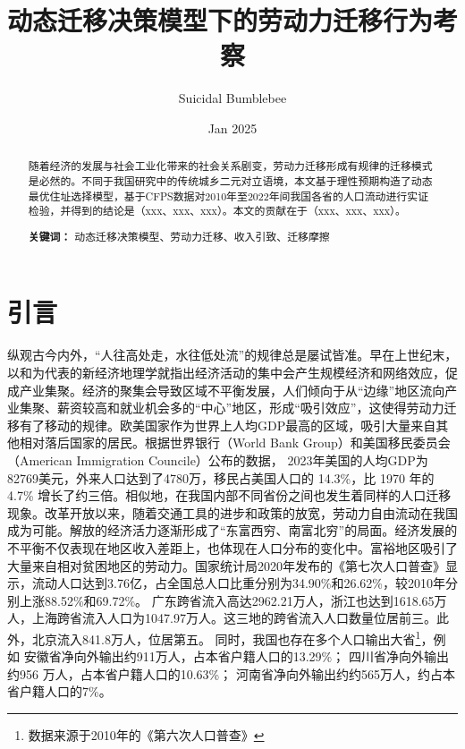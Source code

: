 \documentclass[a4paper,12pt]{article}
\title{动态迁移决策模型下的劳动力迁移行为考察}
\author{Suicidal Bumblebee}
\date{Jan 2025}
\begin{document}
\maketitle


\newpage
\begin{abstract}
  随着经济的发展与社会工业化带来的社会关系剧变，劳动力迁移形成有规律的迁移模式是必然的。不同于我国研究中的传统城乡二元对立语境，本文基于理性预期构造了动态最优住址选择模型，基于CFPS数据对2010年至2022年间我国各省的人口流动进行实证检验，并得到的结论是（xxx、xxx、xxx）。本文的贡献在于（xxx、xxx、xxx）。

  \textbf{关键词：} 动态迁移决策模型、劳动力迁移、收入引致、迁移摩擦
\end{abstract}



\setcounter{page}{1} %
\section{引言}

纵观古今内外，“人往高处走，水往低处流”的规律总是屡试皆准。早在上世纪末，以\cite{krugmanIncreasingReturnsEconomic1991}和\cite{fujitaSpatialEconomyCities1999}为代表的新经济地理学就指出经济活动的集中会产生规模经济和网络效应，促成产业集聚。经济的聚集会导致区域不平衡发展，人们倾向于从“边缘”地区流向产业集聚、薪资较高和就业机会多的“中心”地区，形成“吸引效应”，这使得劳动力迁移有了移动的规律。欧美国家作为世界上人均GDP最高的区域，吸引大量来自其他相对落后国家的居民。根据世界银行（World Bank Group）和美国移民委员会（American Immigration Councile）公布的数据，
2023年美国的人均GDP为82769美元，外来人口达到了4780万，移民占美国人口的 14.3\%，比 1970 年的 4.7\% 增长了约三倍。相似地，在我国内部不同省份之间也发生着同样的人口迁移现象。改革开放以来，随着交通工具的进步和政策的放宽，劳动力自由流动在我国成为可能。解放的经济活力逐渐形成了“东富西穷、南富北穷”的局面。经济发展的不平衡不仅表现在地区收入差距上，也体现在人口分布的变化中。富裕地区吸引了大量来自相对贫困地区的劳动力。国家统计局2020年发布的《第七次人口普查》显示，流动人口达到3.76亿，占全国总人口比重分别为34.90\%和26.62\%，较2010年分别上涨88.52\%和69.72\%。
广东跨省流入高达2962.21万人，浙江也达到1618.65万人，上海跨省流入人口为1047.97万人。这三地的跨省流入人口数量位居前三。此外，北京流入841.8万人，位居第五。
同时，我国也存在多个人口输出大省\footnote{数据来源于2010年的《第六次人口普查》}，例如
安徽省净向外输出约911万人，占本省户籍人口的13.29\%；
四川省净向外输出约956 万人，占本省户籍人口的10.63\%；
河南省净向外输出约约565万人，约占本省户籍人口的7\%。
\end{document}
